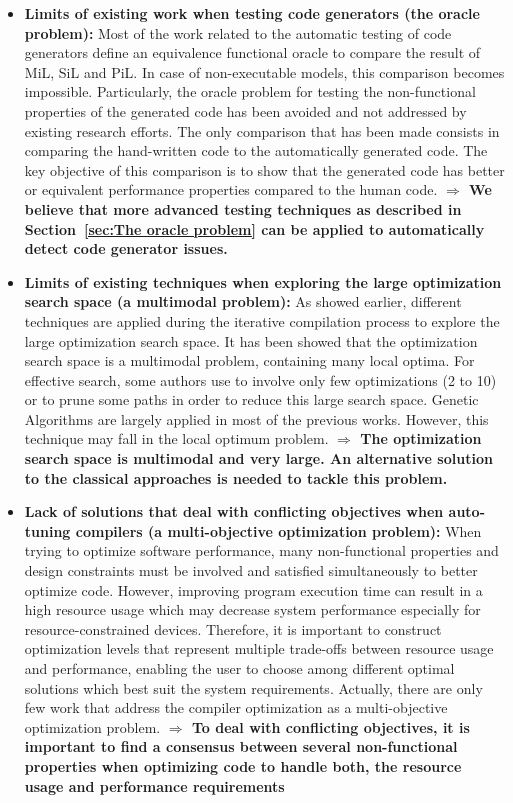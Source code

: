 \begin{itemize}
	
\item \textbf{Limits of existing work when testing code generators (the oracle problem):} Most of the work related to the automatic testing of code generators define an equivalence functional oracle to compare the result of MiL, SiL and PiL. In case of non-executable models, this comparison becomes impossible. Particularly, the oracle problem for testing the non-functional properties of the generated code  has been avoided and not addressed by existing research efforts. The only comparison that has been made consists in comparing the hand-written code to the automatically generated code. The key objective of this comparison is to show that the generated code has better or equivalent performance properties compared to the human code.\newline
\textbf{$\Rightarrow$ 
	We believe that more advanced testing techniques as described in Section~\ref{sec:The oracle problem} can be applied to automatically detect code generator issues.}
	
\item \textbf{Limits of existing techniques when exploring the large optimization search space (a multimodal problem):}
As showed earlier, different techniques are applied during the iterative compilation process to explore the large optimization search space. It has been showed that the optimization search space is a multimodal problem, containing many local optima.
For effective search, some authors use to involve only few optimizations (2 to 10) or to prune some paths in order to reduce this large search space.
Genetic Algorithms are largely applied in most of the previous works. However, this technique may fall in the local optimum problem. 
\newline
\textbf{$\Rightarrow$ The optimization search space is multimodal and very large. An alternative solution to the classical approaches is needed to tackle this problem.}
	
\item \textbf{Lack of solutions that deal with conflicting objectives when auto-tuning compilers (a multi-objective optimization problem):} 
When trying to optimize software performance, many non-functional properties and design constraints
must be involved and satisfied simultaneously to better optimize code. However, improving program
execution time can result in a high resource usage which may decrease system performance especially for resource-constrained devices. Therefore, it is important to construct optimization levels that represent multiple trade-offs between resource usage and performance, enabling the user to choose among different optimal solutions which best suit the system requirements. Actually, there are only few work that address the compiler optimization as a multi-objective optimization problem. 
\newline
\textbf{$\Rightarrow$ To deal with conflicting objectives, it is important to find a consensus between several non-functional properties when optimizing code to handle both, the resource usage and performance requirements}



\end{itemize}
